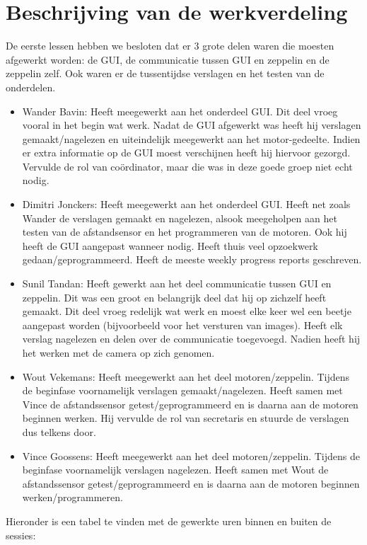 \documentclass[eind]{penoverslag}
\begin{document}
\section{Beschrijving van de werkverdeling}
De eerste lessen hebben we besloten dat er 3 grote delen waren die moesten afgewerkt worden: de GUI, de communicatie tussen GUI en zeppelin en de zeppelin zelf. Ook waren er de tussentijdse verslagen en het testen van de onderdelen. \\
\begin{itemize}
\item Wander Bavin: Heeft meegewerkt aan het onderdeel GUI. Dit deel vroeg vooral in het begin wat werk. Nadat de GUI afgewerkt was heeft hij verslagen gemaakt/nagelezen en uiteindelijk meegewerkt aan het motor-gedeelte. Indien er extra informatie op de GUI moest verschijnen heeft hij hiervoor gezorgd. Vervulde de rol van co\"ordinator, maar die was in deze goede groep niet echt nodig.
\item Dimitri Jonckers: Heeft meegewerkt aan het onderdeel GUI. Heeft net zoals Wander de verslagen gemaakt en nagelezen, alsook meegeholpen aan het testen van de afstandsensor en het programmeren van de motoren. Ook hij heeft de GUI aangepast wanneer nodig. Heeft thuis veel opzoekwerk gedaan/geprogrammeerd. Heeft de meeste weekly progress reports geschreven.
\item Sunil Tandan: Heeft gewerkt aan het deel communicatie tussen GUI en zeppelin. Dit was een groot en belangrijk deel dat hij op zichzelf heeft gemaakt. Dit deel vroeg redelijk wat werk en moest elke keer wel een beetje aangepast worden (bijvoorbeeld voor het versturen van images). Heeft elk verslag nagelezen en delen over de communicatie toegevoegd. Nadien heeft hij het werken met de camera op zich genomen.
\item Wout Vekemans: Heeft meegewerkt aan het deel motoren/zeppelin. Tijdens de beginfase voornamelijk verslagen gemaakt/nagelezen. Heeft samen met Vince de afstandssensor getest/geprogrammeerd en is daarna aan de motoren beginnen werken. Hij vervulde de rol van secretaris en stuurde de verslagen dus telkens door.
\item Vince Goossens: Heeft meegewerkt aan het deel motoren/zeppelin. Tijdens de beginfase voornamelijk verslagen nagelezen. Heeft samen met Wout de afstandssensor getest/geprogrammeerd en is daarna aan de motoren beginnen werken/programmeren.
\end{itemize}

Hieronder is een tabel te vinden met de gewerkte uren binnen en buiten de sessies: \\
\end{document}

